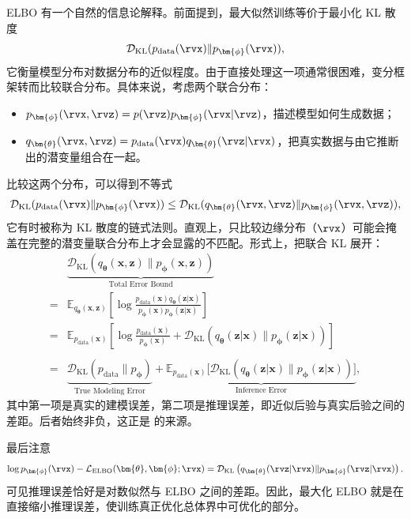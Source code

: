 ELBO 有一个自然的信息论解释。前面提到，最大似然训练等价于最小化 KL 散度
\[
\mathcal{D}_{\mathrm{KL}}(p_{\text{data}}(\rvx) \| p_{\bm{\phi}}(\rvx)),
\]
它衡量模型分布对数据分布的近似程度。由于直接处理这一项通常很困难，变分框架转而比较联合分布。具体来说，考虑两个联合分布：
\begin{itemize}
    \item {} $p_{\bm{\phi}}(\rvx, \rvz) = p(\rvz) p_{\bm{\phi}}(\rvx|\rvz)$，描述模型如何生成数据；
    \item {} $q_{\bm{\theta}}(\rvx, \rvz) = p_{\text{data}}(\rvx) q_{\bm{\theta}}(\rvz|\rvx)$，把真实数据与由它推断出的潜变量组合在一起。
\end{itemize}
比较这两个分布，可以得到不等式
\begin{align}\label{eq:joint-bound}
    \mathcal{D}_{\mathrm{KL}}(p_{\text{data}}(\rvx) \| p_{\bm{\phi}}(\rvx))
    \leq \mathcal{D}_{\mathrm{KL}}(q_{\bm{\theta}}(\rvx,\rvz) \| p_{\bm{\phi}}(\rvx,\rvz)),
\end{align}
它有时被称为 KL 散度的链式法则。直观上，只比较边缘分布（$\rvx$）可能会掩盖在完整的潜变量联合分布上才会显露的不匹配。形式上，把联合 KL 展开：
\begin{align*}
    &\underbrace{\mathcal{D}_{\mathrm{KL}}(q_{\bm{\theta}}(\mathbf{x}, \mathbf{z}) \| p_{\bm{\phi}}(\mathbf{x}, \mathbf{z}))}_{\text{Total Error Bound}}
    \\=& \mathbb{E}_{q_{\bm{\theta}}(\mathbf{x}, \mathbf{z})} \left[ \log \frac{p_{\text{data}}(\mathbf{x}) q_{\bm{\theta}}(\mathbf{z}|\mathbf{x})}{p_{\bm{\phi}}(\mathbf{x}) p_{\bm{\phi}}(\mathbf{z}|\mathbf{x})} \right] \\=&\mathbb{E}_{p_{\text{data}}(\mathbf{x})} \left[ \log \frac{p_{\text{data}}(\mathbf{x})}{p_{\bm{\phi}}(\mathbf{x})} + \mathcal{D}_{\mathrm{KL}}\left( q_{\bm{\theta}}(\mathbf{z}|\mathbf{x}) \| p_{\bm{\phi}}(\mathbf{z}|\mathbf{x}) \right) \right] \\
    \\=&  \underbrace{\mathcal{D}_{\mathrm{KL}}(p_{\text{data}} \| p_{\bm{\phi}})}_{\text{True Modeling Error}} + \underbrace{\mathbb{E}_{p_{\text{data}}(\mathbf{x})} \big[ \mathcal{D}_{\mathrm{KL}}( q_{\bm{\theta}}(\mathbf{z}|\mathbf{x}) \| p_{\bm{\phi}}(\mathbf{z}|\mathbf{x}) ) \big]}_{\text{Inference Error}},
\end{align*}
其中第一项是真实的建模误差，第二项是推理误差，即近似后验与真实后验之间的差距。后者始终非负，这正是  的来源。

最后注意
\[
\log p_{\bm{\phi}}(\rvx) - \mathcal{L}_{\text{ELBO}}(\bm{\theta},\bm{\phi};\rvx)
= \mathcal{D}_{\mathrm{KL}} \left(q_{\bm{\theta}}(\rvz|\rvx)\|p_{\bm{\phi}}(\rvz|\rvx)\right).
\]
可见推理误差恰好是对数似然与 ELBO 之间的差距。因此，最大化 ELBO 就是在直接缩小推理误差，使训练真正优化总体界中可优化的部分。


